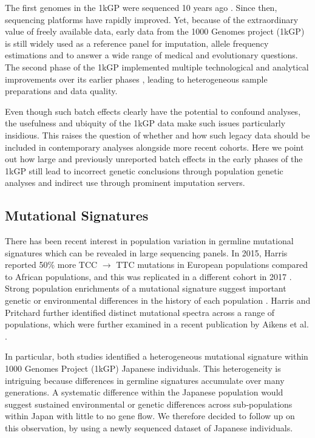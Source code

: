 \documentclass[
11pt, %
oneside, %
english, %
doublespacing, %
headsepline, %
chapterinoneline, %
]{MastersDoctoralThesis} %
\begin{document}
The first genomes in the 1kGP were sequenced 10 years ago \citep{VanDijk2014}. 
Since then, sequencing platforms have rapidly improved. 
Yet, because of the extraordinary value of freely available data, early data from the 1000 Genomes project (1kGP) is still widely used as a reference panel for imputation, allele frequency estimations and to answer a wide range of medical and evolutionary questions. 
The second phase of the 1kGP implemented multiple technological and analytical improvements over its earlier phases \citep{The1000GenomesProjectConsortium2012}, leading to heterogeneous sample preparations and data quality.

Even though such batch effects clearly have the potential to confound analyses, the usefulness and ubiquity of the 1kGP data make such issues particularly insidious.   
This raises the question of whether and how such legacy data should be included in contemporary analyses alongside more recent cohorts.
Here we point out how large and previously unreported batch effects in the early phases of the 1kGP still lead to incorrect genetic conclusions through population genetic analyses and indirect use through prominent imputation servers.

\subsection{Mutational Signatures}
There has been recent interest in population variation in germline mutational signatures which can be revealed in large sequencing panels. 
In 2015, Harris reported 50\% more TCC ${\rightarrow}$ TTC mutations in European populations compared to African populations, and this was replicated in a different cohort in 2017 \citep{Harris2015a, Harris2017a, Mathieson2017a}. 
Strong population enrichments of a mutational signature suggest important genetic or environmental differences in the history of each population \citep{Harris2015a, Harris2017a}. 
Harris and Pritchard further identified distinct mutational spectra across a range of populations, which were further examined in a recent publication by Aikens et al. \citep{Harris2017a,Aikens2018}.
 
In particular, both studies  identified a heterogeneous mutational signature within 1000 Genomes Project (1kGP) Japanese individuals.
This heterogeneity is intriguing because differences in germline signatures accumulate over many generations.
A systematic difference within the Japanese population would suggest sustained environmental or genetic differences across sub-populations within Japan with little to no gene flow.
We therefore decided to follow up on this observation, by using a newly sequenced dataset of Japanese individuals. 
\end{document}
